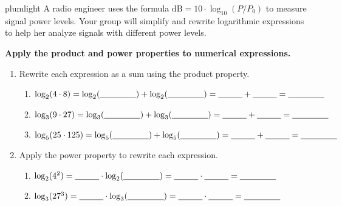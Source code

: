 \documentclass[10pt]{article}
\begin{document}
\namepartnerperiod

\vspace{0.1in}

\begin{scenariobox}{plumlight}
A radio engineer uses the formula $\text{dB} = 10 \cdot \log_{10}(P/P_0)$ to measure signal
power levels. Your group will simplify and rewrite logarithmic expressions to help her
analyze signals with different power levels.
\end{scenariobox}

\vspace{0.1in}

\begin{tcolorbox}[colback=white, colframe=black!40,
    title=\textbf{Tier R --- Remediate},
    fonttitle=\bfseries, arc=2mm, left=3mm, right=3mm, top=2mm, bottom=2mm]

\textbf{Apply the product and power properties to numerical expressions.}

\begin{enumerate}[leftmargin=1.8em, itemsep=10pt]

\item Rewrite each expression as a sum using the product property.

\vspace{4pt}
\begin{enumerate}[leftmargin=1.5em, itemsep=8pt, label=\alph*.]
  \item $\log_2(4 \cdot 8) = \log_2(\blank{1.5cm}) + \log_2(\blank{1.5cm}) = \blank{1cm} + \blank{1cm} = \blank{1.5cm}$
  \item $\log_3(9 \cdot 27) = \log_3(\blank{1.5cm}) + \log_3(\blank{1.5cm}) = \blank{1cm} + \blank{1cm} = \blank{1.5cm}$
  \item $\log_5(25 \cdot 125) = \log_5(\blank{1.5cm}) + \log_5(\blank{1.5cm}) = \blank{1cm} + \blank{1cm} = \blank{1.5cm}$
\end{enumerate}

\vspace{4pt}
\item Apply the power property to rewrite each expression.

\vspace{4pt}
\begin{enumerate}[leftmargin=1.5em, itemsep=8pt, label=\alph*.]
  \item $\log_2(4^2) = \blank{1cm} \cdot \log_2(\blank{1.5cm}) = \blank{1cm} \cdot \blank{1cm} = \blank{1.5cm}$
  \item $\log_3(27^3) = \blank{1cm} \cdot \log_3(\blank{1.5cm}) = \blank{1cm} \cdot \blank{1cm} = \blank{1.5cm}$
\end{enumerate}

\end{enumerate}
\end{tcolorbox}
\end{document}
